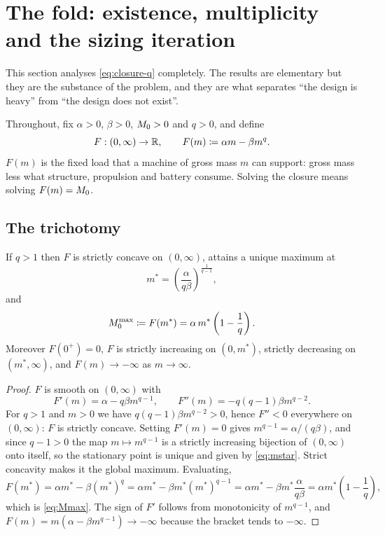 ﻿\section{The fold: existence, multiplicity and the sizing iteration}
\label{sec:fold}

This section analyses \cref{eq:closure-q} completely. The results are
elementary but they are the substance of the problem, and they are what
separates ``the design is heavy'' from ``the design does not exist''.

Throughout, fix $\alpha>0$, $\beta>0$, $M_0>0$ and $q>0$, and define
\begin{equation}
  F:(0,\infty)\to\mathbb{R}, \qquad F(m) \coloneqq \alpha m - \beta m^{q} .
  \label{eq:F}
\end{equation}
$F(m)$ is the fixed load that a machine of gross mass $m$ can support: gross
mass less what structure, propulsion and battery consume. Solving the closure
means solving $F(m)=M_0$.

\subsection{The trichotomy}

\begin{lemma}
\label{lem:concave}
If $q>1$ then $F$ is strictly concave on $(0,\infty)$, attains a unique
maximum at
\begin{equation}
  m^{*} = \left(\frac{\alpha}{q\beta}\right)^{\frac{1}{q-1}} ,
  \label{eq:mstar}
\end{equation}
and
\begin{equation}
  M_0^{\max} \coloneqq F(m^{*}) = \alpha\, m^{*}\left(1 - \frac{1}{q}\right) .
  \label{eq:Mmax}
\end{equation}
Moreover $F(0^+)=0$, $F$ is strictly increasing on $(0,m^*)$, strictly
decreasing on $(m^*,\infty)$, and $F(m)\to-\infty$ as $m\to\infty$.
\end{lemma}

\begin{proof}
$F$ is smooth on $(0,\infty)$ with
\begin{equation}
  F'(m) = \alpha - q\beta m^{q-1},
  \qquad
  F''(m) = -q(q-1)\beta m^{q-2} .
  \label{eq:Fderiv}
\end{equation}
For $q>1$ and $m>0$ we have $q(q-1)\beta m^{q-2}>0$, hence $F''<0$ everywhere
on $(0,\infty)$: $F$ is strictly concave. Setting $F'(m)=0$ gives
$m^{q-1} = \alpha/(q\beta)$, and since $q-1>0$ the map $m\mapsto m^{q-1}$ is a
strictly increasing bijection of $(0,\infty)$ onto itself, so the stationary
point is unique and given by \cref{eq:mstar}. Strict concavity makes it the
global maximum. Evaluating,
\[
  F(m^*) = \alpha m^* - \beta (m^*)^{q}
         = \alpha m^* - \beta m^* (m^*)^{q-1}
         = \alpha m^* - \beta m^* \frac{\alpha}{q\beta}
         = \alpha m^*\left(1-\frac1q\right),
\]
which is \cref{eq:Mmax}. The sign of $F'$ follows from monotonicity of
$m^{q-1}$, and $F(m) = m(\alpha - \beta m^{q-1}) \to -\infty$ because the
bracket tends to $-\infty$.
\end{proof}


